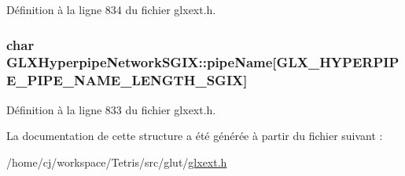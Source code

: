 Définition à la ligne 834 du fichier glxext.\-h.

\hypertarget{struct_g_l_x_hyperpipe_network_s_g_i_x_a6338b9717fa895aec16b932f2ef693ed}{
\subsubsection[{pipe\-Name}]{\setlength{\rightskip}{0pt plus 5cm}char G\-L\-X\-Hyperpipe\-Network\-S\-G\-I\-X\-::pipe\-Name\mbox{[}{\bf G\-L\-X\-\_\-\-H\-Y\-P\-E\-R\-P\-I\-P\-E\-\_\-\-P\-I\-P\-E\-\_\-\-N\-A\-M\-E\-\_\-\-L\-E\-N\-G\-T\-H\-\_\-\-S\-G\-I\-X}\mbox{]}}}\label{struct_g_l_x_hyperpipe_network_s_g_i_x_a6338b9717fa895aec16b932f2ef693ed}


Définition à la ligne 833 du fichier glxext.\-h.



La documentation de cette structure a été générée à partir du fichier suivant \-:\begin{DoxyCompactItemize}
\item 
/home/cj/workspace/\-Tetris/src/glut/\hyperlink{glxext_8h}{glxext.\-h}\end{DoxyCompactItemize}
